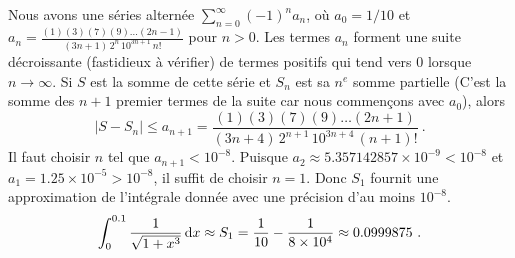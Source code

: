 {Nous avons une séries alternée $\displaystyle \sum_{n=0}^\infty (-1)^n a_n$,
où $a_0 = 1/10$ et
$a_n = \displaystyle \frac{(1)(3)(7)(9)\ldots(2n-1)}
{(3n+1)\, 2^n\, 10^{3n+1}\, n!}$ pour $n>0$.
Les termes $\displaystyle a_n$ forment une suite décroissante
(fastidieux à vérifier) de termes positifs qui tend vers $0$ lorsque
$n\rightarrow \infty$.  Si $S$ est la somme de cette série et $S_n$
est sa $n^e$ somme partielle (C'est la somme des $n+1$ premier termes
de la suite car nous commençons avec $a_0$), alors
\[
  | S - S_n | \leq a_{n+1} =
\frac{(1)(3)(7)(9)\ldots(2n+1)}
{(3n+4)\, 2^{n+1}\, 10^{3n+4}\,(n+1)!} \ .
\]
Il faut choisir $n$ tel que $a_{n+1} < 10^{-8}$.
Puisque $a_2 \approx 5.357142857\times 10^{-9} < 10^{-8}$ et
$a_1 = 1.25 \times 10^{-5} > 10^{-8}$, il suffit de choisir $n=1$.
Donc $S_1$ fournit une approximation de l'intégrale donnée avec une
précision d'au moins $10^{-8}$.
\[
\int_0^{0.1} \frac{1}{\sqrt{1+x^3}} \,\mathrm{d}x \approx
S_1 = \frac{1}{10} - \frac{1}{8 \times 10^4}
\approx 0.0999875 \ .
\]
}

